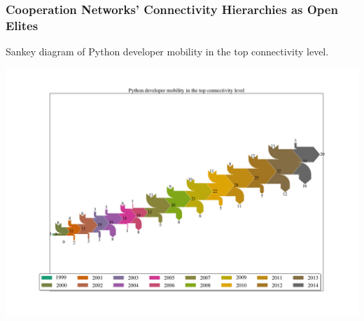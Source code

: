 \documentclass[ignorenonframetext,red,8pt,notes=show]{beamer}
\begin{document}
\begin{frame}
\frametitle{Cooperation Networks' Connectivity Hierarchies as Open Elites}

Sankey diagram of Python developer mobility in the top connectivity level.

\begin{center}
\includegraphics[scale=0.2]{../../figures/sankey_mobility_python_years}
\end{center}

\end{frame}
\end{document}
